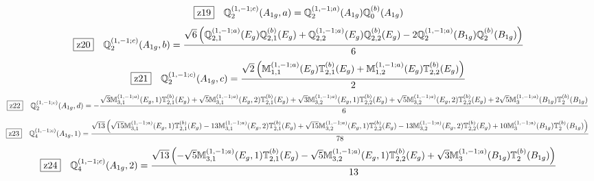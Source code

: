 \documentclass[fleqn,10pt,landscape]{jsarticle}
\begin{document}
\begin{dmath*}
\hspace*{3mm}\fbox{z19}\quad \mathbb{Q}_{2}^{(1,-1;c)}(A_{1g},a)=\mathbb{Q}_{2}^{(1,-1;a)}(A_{1g}) \mathbb{Q}_{0}^{(b)}(A_{1g})
\end{dmath*}
\begin{dmath*}
\hspace*{3mm}\fbox{z20}\quad \mathbb{Q}_{2}^{(1,-1;c)}(A_{1g},b)=\frac{\sqrt{6} \left(\mathbb{Q}_{2,1}^{(1,-1;a)}(E_{g}) \mathbb{Q}_{2,1}^{(b)}(E_{g}) + \mathbb{Q}_{2,2}^{(1,-1;a)}(E_{g}) \mathbb{Q}_{2,2}^{(b)}(E_{g}) - 2 \mathbb{Q}_{2}^{(1,-1;a)}(B_{1g}) \mathbb{Q}_{2}^{(b)}(B_{1g})\right)}{6}
\end{dmath*}
\begin{dmath*}
\hspace*{3mm}\fbox{z21}\quad \mathbb{Q}_{2}^{(1,-1;c)}(A_{1g},c)=\frac{\sqrt{2} \left(\mathbb{M}_{1,1}^{(1,-1;a)}(E_{g}) \mathbb{T}_{2,1}^{(b)}(E_{g}) + \mathbb{M}_{1,2}^{(1,-1;a)}(E_{g}) \mathbb{T}_{2,2}^{(b)}(E_{g})\right)}{2}
\end{dmath*}
\begin{dmath*}
\hspace*{3mm}\fbox{z22}\quad \mathbb{Q}_{2}^{(1,-1;c)}(A_{1g},d)=- \frac{\sqrt{3} \mathbb{M}_{3,1}^{(1,-1;a)}(E_{g},1) \mathbb{T}_{2,1}^{(b)}(E_{g}) + \sqrt{5} \mathbb{M}_{3,1}^{(1,-1;a)}(E_{g},2) \mathbb{T}_{2,1}^{(b)}(E_{g}) + \sqrt{3} \mathbb{M}_{3,2}^{(1,-1;a)}(E_{g},1) \mathbb{T}_{2,2}^{(b)}(E_{g}) + \sqrt{5} \mathbb{M}_{3,2}^{(1,-1;a)}(E_{g},2) \mathbb{T}_{2,2}^{(b)}(E_{g}) + 2 \sqrt{5} \mathbb{M}_{3}^{(1,-1;a)}(B_{1g}) \mathbb{T}_{2}^{(b)}(B_{1g})}{6}
\end{dmath*}
\begin{dmath*}
\hspace*{3mm}\fbox{z23}\quad \mathbb{Q}_{4}^{(1,-1;c)}(A_{1g},1)=\frac{\sqrt{13} \left(\sqrt{15} \mathbb{M}_{3,1}^{(1,-1;a)}(E_{g},1) \mathbb{T}_{2,1}^{(b)}(E_{g}) - 13 \mathbb{M}_{3,1}^{(1,-1;a)}(E_{g},2) \mathbb{T}_{2,1}^{(b)}(E_{g}) + \sqrt{15} \mathbb{M}_{3,2}^{(1,-1;a)}(E_{g},1) \mathbb{T}_{2,2}^{(b)}(E_{g}) - 13 \mathbb{M}_{3,2}^{(1,-1;a)}(E_{g},2) \mathbb{T}_{2,2}^{(b)}(E_{g}) + 10 \mathbb{M}_{3}^{(1,-1;a)}(B_{1g}) \mathbb{T}_{2}^{(b)}(B_{1g})\right)}{78}
\end{dmath*}
\begin{dmath*}
\hspace*{3mm}\fbox{z24}\quad \mathbb{Q}_{4}^{(1,-1;c)}(A_{1g},2)=\frac{\sqrt{13} \left(- \sqrt{5} \mathbb{M}_{3,1}^{(1,-1;a)}(E_{g},1) \mathbb{T}_{2,1}^{(b)}(E_{g}) - \sqrt{5} \mathbb{M}_{3,2}^{(1,-1;a)}(E_{g},1) \mathbb{T}_{2,2}^{(b)}(E_{g}) + \sqrt{3} \mathbb{M}_{3}^{(1,-1;a)}(B_{1g}) \mathbb{T}_{2}^{(b)}(B_{1g})\right)}{13}
\end{dmath*}
\end{document}
